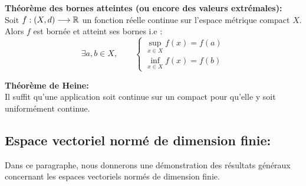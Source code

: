 \documentclass[12pt,a4paper]{article}
\begin{document}
	
	\textbf{Théorème des bornes atteintes (ou encore des valeurs extrémales):}\\
	Soit $f:(X,d)\longrightarrow \mathbb{R}$ un fonction réelle continue sur l'espace métrique compact $X$.\\
	Alors $f$ est bornée et atteint ses bornes i.e :
	\[ \exists a,b\in X, \qquad \begin{cases}
		\sup\limits_{x\in X} f(x)=f(a)\\\inf\limits_{x\in X} f(x)=f(b)
	\end{cases}\]  
	
	
	\textbf{Théorème de Heine:}\\
	Il suffit qu'une application soit continue sur un compact pour qu'elle y soit uniformément continue.
	
	\subsection{Espace vectoriel normé de dimension finie:}
	Dans ce paragraphe, nous donnerons une démonstration des résultats généraux concernant les espaces vectoriels normés de dimension finie.\\
	
\end{document}
